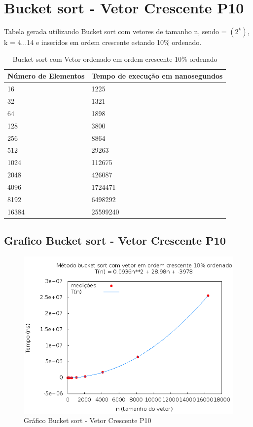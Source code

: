 \documentclass[12pt,a4paper,twoside]{report}
\begin{document}
\section{Bucket sort - Vetor Crescente P10}
Tabela gerada utilizando Bucket sort com vetores de tamanho n, sendo = $(2^k)$, k = 4...14 e inseridos em ordem crescente estando 10\% ordenado.

\begin{table}[H]
\centering
\caption{Bucket sort com Vetor ordenado em ordem crescente 10\% ordenado}
\label{my-label}
\begin{tabular}{|l|l|}
\hline
\multicolumn{1}{|c|}{\textbf{Número de Elementos}} & \multicolumn{1}{c|}{\textbf{Tempo de execução em nanosegundos}} \\ \hline
16 & 1225 \\ \hline
32 & 1321 \\ \hline
64 & 1898 \\ \hline
128 & 3800 \\ \hline
256 & 8864 \\ \hline
512 & 29263 \\ \hline
1024 & 112675 \\ \hline
2048 & 426087 \\ \hline
4096 & 1724471 \\ \hline
8192 & 6498292 \\ \hline
16384 & 25599240 \\ \hline
\end{tabular}
\end{table}

\subsection{Grafico Bucket sort - Vetor Crescente P10}
\begin{figure}[H]
    \centering
    \includegraphics[width=0.7\linewidth]{graficos/Bucket/vIntCrescenteP10/vIntCrescenteP10.png}
  \caption{Gráfico Bucket sort - Vetor Crescente P10}
\end{figure}
\end{document}
